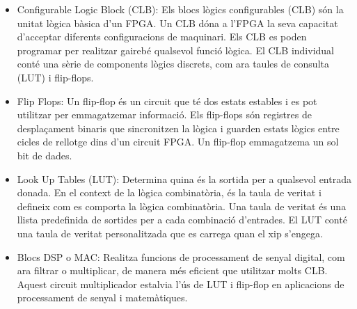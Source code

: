 \begin{itemize}
    \item Configurable Logic Block (CLB): Els blocs lògics configurables (CLB) són la unitat lògica bàsica d'un FPGA. Un CLB dóna a l'FPGA la seva capacitat d'acceptar diferents configuracions de maquinari. Els CLB es poden programar per realitzar gairebé qualsevol funció lògica. El CLB individual conté una sèrie de components lògics discrets, com ara taules de consulta (LUT) i flip-flops.
    \item Flip Flops: Un flip-flop és un circuit que té dos estats estables i es pot utilitzar per emmagatzemar informació. Els flip-flops són registres de desplaçament binaris que sincronitzen la lògica i guarden estats lògics entre cicles de rellotge dins d'un circuit FPGA. Un flip-flop emmagatzema un sol bit de dades.
    \item Look Up Tables (LUT): Determina quina és la sortida per a qualsevol entrada donada. En el context de la lògica combinatòria, és la taula de veritat i defineix com es comporta la lògica combinatòria. Una taula de veritat és una llista predefinida de sortides per a cada combinació d'entrades. El LUT conté una taula de veritat personalitzada que es carrega quan el xip s'engega.
    \item Blocs DSP o MAC: Realitza funcions de processament de senyal digital, com ara filtrar o multiplicar, de manera més eficient que utilitzar molts CLB. Aquest circuit multiplicador estalvia l'ús de LUT i flip-flop en aplicacions de processament de senyal i matemàtiques.
\end{itemize}

